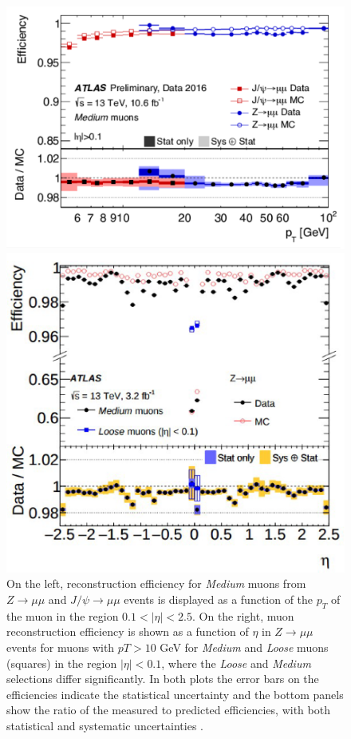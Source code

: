 \begin{figure}[!h]
  \centering
  \begin{minipage}[b]{0.5\textwidth}
    \includegraphics[width=\textwidth]{Pictures/efficiencyoverpt.PNG}
  \end{minipage}
  \hspace{.5cm}
  \begin{minipage}[b]{0.4\textwidth}
    \includegraphics[width=\textwidth]{Pictures/efficiencyovereta.PNG}
  \end{minipage}
  \caption{On the left, reconstruction efficiency for \textit{Medium} muons from $Z \rightarrow \mu\mu$ and $J/\psi \rightarrow \mu\mu$ events is displayed as a function of the $p_T$ of the muon in the region $0.1 < |\eta| < 2.5$.  On the right, muon reconstruction efficiency is shown as a function of $\eta$ in $Z \rightarrow \mu\mu$ events for muons with $pT > 10$ GeV for \textit{Medium} and \textit{Loose} muons (squares) in the region $|\eta| < 0.1$, where the \textit{Loose} and \textit{Medium} selections differ significantly. In both plots the error bars on the efficiencies indicate the statistical uncertainty and the bottom panels show the ratio of the measured to predicted efficiencies, with both statistical and systematic uncertainties \cite{MCPpaper}.}

\end{figure}
